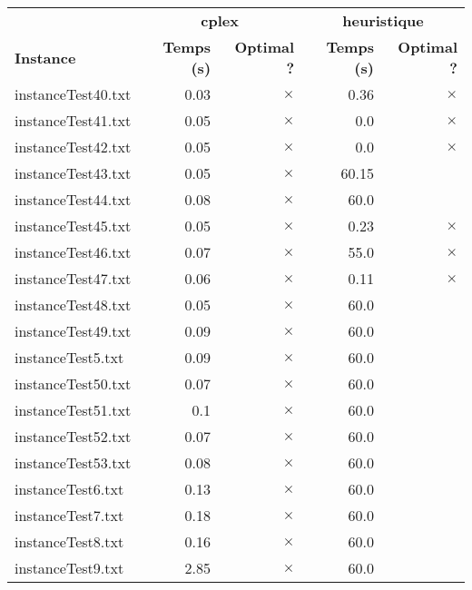 \documentclass{article}
\begin{document}
\newpage
\begin{center}
\renewcommand{\arraystretch}{1.4} 
 \begin{tabular}{lrrrr}
	\hline
 & \multicolumn{2}{c}{\textbf{cplex}} & \multicolumn{2}{c}{\textbf{heuristique}}\\
\textbf{Instance}  & \textbf{Temps (s)} & \textbf{Optimal ?}  & \textbf{Temps (s)} & \textbf{Optimal ?} \\\hline

instanceTest40.txt & 0.03 & 
$\times$
 & 0.36 & 
$\times$
\\
instanceTest41.txt & 0.05 & 
$\times$
 & 0.0 & 
$\times$
\\
instanceTest42.txt & 0.05 & 
$\times$
 & 0.0 & 
$\times$
\\
instanceTest43.txt & 0.05 & 
$\times$
 & 60.15 & 
\\
instanceTest44.txt & 0.08 & 
$\times$
 & 60.0 & 
\\
instanceTest45.txt & 0.05 & 
$\times$
 & 0.23 & 
$\times$
\\
instanceTest46.txt & 0.07 & 
$\times$
 & 55.0 & 
$\times$
\\
instanceTest47.txt & 0.06 & 
$\times$
 & 0.11 & 
$\times$
\\
instanceTest48.txt & 0.05 & 
$\times$
 & 60.0 & 
\\
instanceTest49.txt & 0.09 & 
$\times$
 & 60.0 & 
\\
instanceTest5.txt & 0.09 & 
$\times$
 & 60.0 & 
\\
instanceTest50.txt & 0.07 & 
$\times$
 & 60.0 & 
\\
instanceTest51.txt & 0.1 & 
$\times$
 & 60.0 & 
\\
instanceTest52.txt & 0.07 & 
$\times$
 & 60.0 & 
\\
instanceTest53.txt & 0.08 & 
$\times$
 & 60.0 & 
\\
instanceTest6.txt & 0.13 & 
$\times$
 & 60.0 & 
\\
instanceTest7.txt & 0.18 & 
$\times$
 & 60.0 & 
\\
instanceTest8.txt & 0.16 & 
$\times$
 & 60.0 & 
\\
instanceTest9.txt & 2.85 & 
$\times$
 & 60.0 & 
\\
\hline\end{tabular}
\end{center}
\end{document}
